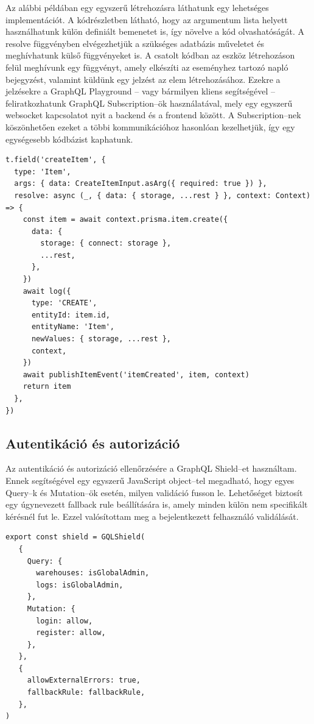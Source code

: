 Az alábbi példában egy egyszerű létrehozásra láthatunk egy lehetséges implementációt.
A kódrészletben látható, hogy az argumentum lista helyett használhatunk külön definiált bemenetet is, így növelve a kód olvashatóságát.
A resolve függvényben elvégezhetjük a szükséges adatbázis műveletet és meghívhatunk külső függvényeket is.
A csatolt kódban az eszköz létrehozáson felül meghívunk egy függvényt, amely elkészíti az eseményhez tartozó napló bejegyzést, valamint küldünk egy jelzést az elem létrehozásához.
Ezekre a jelzésekre a GraphQL Playground – vagy bármilyen kliens segítségével – feliratkozhatunk GraphQL Subscription–ök használatával, mely egy egyszerű websocket kapcsolatot nyit a backend és a frontend között. A Subscription–nek köszönhetően ezeket a többi kommunikációhoz hasonlóan kezelhetjük, így egy egységesebb kódbázist kaphatunk.


\begin{lstlisting}[style=ES6]
t.field('createItem', {
  type: 'Item',
  args: { data: CreateItemInput.asArg({ required: true }) },
  resolve: async (_, { data: { storage, ...rest } }, context: Context) => {
    const item = await context.prisma.item.create({
      data: {
        storage: { connect: storage },
        ...rest,
      },
    })
    await log({
      type: 'CREATE',
      entityId: item.id,
      entityName: 'Item',
      newValues: { storage, ...rest },
      context,
    })
    await publishItemEvent('itemCreated', item, context)
    return item
  },
})
\end{lstlisting}

\subsection{Autentikáció és autorizáció}
Az autentikáció és autorizáció ellenőrzésére a GraphQL Shield–et használtam. 
Ennek segítségével egy egyszerű JavaScript object–tel megadható, hogy egyes Query–k és Mutation–ök esetén, milyen validáció fusson le.
Lehetőséget biztosít egy úgynevezett fallback rule beállítására is, amely minden külön nem specifikált kérésnél fut le.
Ezzel valósítottam meg a bejelentkezett felhasználó validálását.

\begin{lstlisting}[style=ES6]
export const shield = GQLShield(
   {
     Query: {
       warehouses: isGlobalAdmin,
       logs: isGlobalAdmin,
     },
     Mutation: {
       login: allow,
       register: allow,
     },
   },
   {
     allowExternalErrors: true,
     fallbackRule: fallbackRule,
   },
)
\end{lstlisting}


